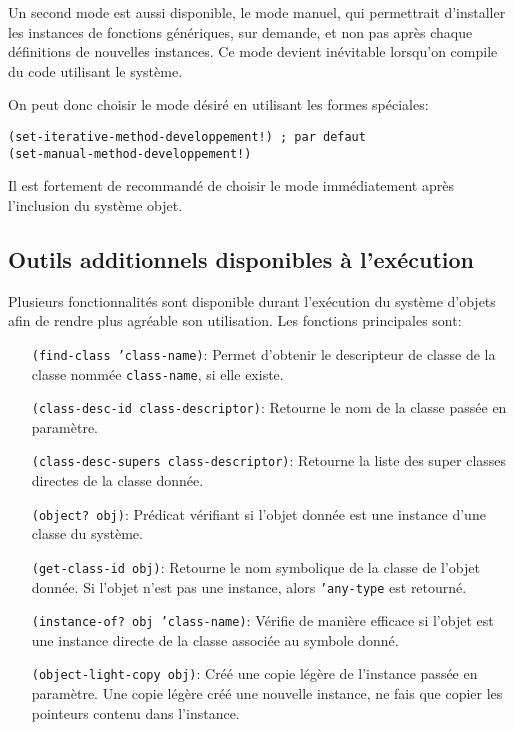        Un second mode est aussi disponible, le mode manuel, qui
        permettrait d'installer les instances de fonctions génériques,
        sur demande, et non pas après chaque définitions de nouvelles
        instances. Ce mode devient inévitable lorsqu'on compile du
        code utilisant le système.

        On peut donc choisir le mode désiré en utilisant les formes
        spéciales:

        \begin{lstlisting}
(set-iterative-method-developpement!) ; par defaut
(set-manual-method-developpement!)
        \end{lstlisting}

        Il est fortement de recommandé de choisir le mode
        immédiatement après l'inclusion du système objet.

    \subsection{Outils additionnels disponibles à l'exécution}

      Plusieurs fonctionnalités sont disponible durant l'exécution du
      système d'objets afin de rendre plus agréable son
      utilisation. Les fonctions principales sont:

      \begin{itemize}
      \item[\texttt{(find-class 'class-name)}:] Permet d'obtenir le
        descripteur de classe de la classe nommée
        \texttt{class-name}, si elle existe.
      \item[]
      \item[\texttt{(class-desc-id class-descriptor)}:] Retourne le
        nom de la classe passée en paramètre.
      \item[]
      \item[\texttt{(class-desc-supers class-descriptor)}:] Retourne
        la liste des super classes directes de la classe donnée.
      \item[]
      \item[\texttt{(object? obj)}:] Prédicat vérifiant si l'objet
        donnée est une instance d'une classe du système.
      \item[]
      \item[\texttt{(get-class-id obj)}:] Retourne le nom symbolique
        de la classe de l'objet donnée. Si l'objet n'est pas une
        instance, alors \texttt{'any-type} est retourné.
      \item[]
      \item[\texttt{(instance-of? obj 'class-name)}:] Vérifie de
        manière efficace si l'objet est une instance directe de la
        classe associée au symbole donné.
      \item[]
      \item[\texttt{(object-light-copy obj)}:] Créé une copie légère
        de l'instance passée en paramètre. Une copie légère créé une
        nouvelle instance, ne fais que copier les pointeurs contenu
        dans l'instance.
      \end{itemize}

